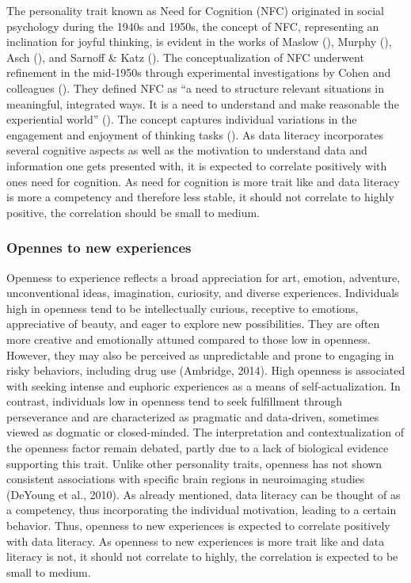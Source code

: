 \documentclass[
  12pt,
  a4paper,
  twoside]{article}
\begin{document}
The personality trait known as Need for Cognition (NFC) originated in
social psychology during the 1940s and 1950s, the concept of NFC,
representing an inclination for joyful thinking, is evident in the works
of Maslow (), Murphy
(), Asch (),
and Sarnoff \& Katz (). The
conceptualization of NFC underwent refinement in the mid-1950s through
experimental investigations by Cohen and colleagues
(). They defined NFC as ``a
need to structure relevant situations in meaningful, integrated ways. It
is a need to understand and make reasonable the experiential world''
(). The concept
captures individual variations in the engagement and enjoyment of
thinking tasks (). As data
literacy incorporates several cognitive aspects as well as the
motivation to understand data and information one gets presented with,
it is expected to correlate positively with ones need for cognition. As
need for cognition is more trait like and data literacy is more a
competency and therefore less stable, it should not correlate to highly
positive, the correlation should be small to medium.

\subsubsection{Opennes to new
experiences}\label{opennes-to-new-experiences}

Openness to experience reflects a broad appreciation for art, emotion,
adventure, unconventional ideas, imagination, curiosity, and diverse
experiences. Individuals high in openness tend to be intellectually
curious, receptive to emotions, appreciative of beauty, and eager to
explore new possibilities. They are often more creative and emotionally
attuned compared to those low in openness. However, they may also be
perceived as unpredictable and prone to engaging in risky behaviors,
including drug use (Ambridge, 2014). High openness is associated with
seeking intense and euphoric experiences as a means of
self-actualization. In contrast, individuals low in openness tend to
seek fulfillment through perseverance and are characterized as pragmatic
and data-driven, sometimes viewed as dogmatic or closed-minded. The
interpretation and contextualization of the openness factor remain
debated, partly due to a lack of biological evidence supporting this
trait. Unlike other personality traits, openness has not shown
consistent associations with specific brain regions in neuroimaging
studies (DeYoung et al., 2010). As already mentioned, data literacy can
be thought of as a competency, thus incorporating the individual
motivation, leading to a certain behavior. Thus, openness to new
experiences is expected to correlate positively with data literacy. As
openness to new experiences is more trait like and data literacy is not,
it should not correlate to highly, the correlation is expected to be
small to medium.
\end{document}
